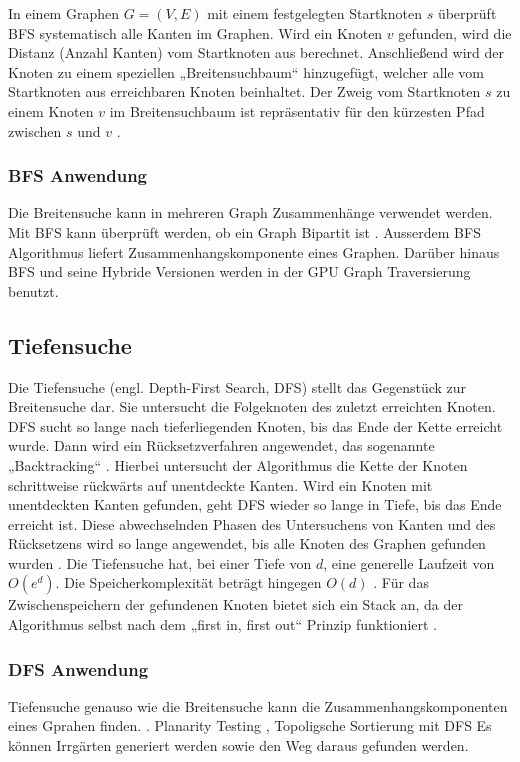 In einem Graphen $G = (V, E)$ mit einem festgelegten Startknoten $s$ überprüft BFS systematisch alle Kanten im Graphen. Wird ein Knoten $v$ gefunden, wird die Distanz (Anzahl Kanten) vom Startknoten aus berechnet. Anschließend wird der Knoten zu einem speziellen „Breitensuchbaum“ hinzugefügt, welcher alle vom Startknoten aus erreichbaren Knoten beinhaltet. Der Zweig vom Startknoten $s$ zu einem Knoten $v$ im Breitensuchbaum ist repräsentativ für den kürzesten Pfad zwischen $s$ und $v$ \cite{Cormen.2009}.

\subsubsection{BFS Anwendung}
Die Breitensuche kann in mehreren Graph Zusammenhänge verwendet werden.  Mit BFS kann überprüft werden, ob ein Graph Bipartit ist \cite{propTest}. Ausserdem BFS Algorithmus liefert Zusammenhangskomponente eines Graphen\cite{schmitz}. Darüber hinaus BFS und seine Hybride Versionen\cite{effHyb} werden in der GPU Graph Traversierung benutzt\cite{scaleGPU}. 

\subsection{Tiefensuche}

Die Tiefensuche (engl. Depth-First Search, DFS) stellt das Gegenstück zur Breitensuche dar. Sie untersucht die Folgeknoten des zuletzt erreichten Knoten. DFS sucht so lange nach tieferliegenden Knoten, bis das Ende der Kette erreicht wurde. Dann wird ein Rücksetzverfahren angewendet, das sogenannte „Backtracking“ \cite{Tarjan.1972}. Hierbei untersucht der Algorithmus die Kette der Knoten schrittweise rückwärts auf unentdeckte Kanten. Wird ein Knoten mit unentdeckten Kanten gefunden, geht DFS wieder so lange in Tiefe, bis das Ende erreicht ist. Diese abwechselnden Phasen des Untersuchens von Kanten und des Rücksetzens wird so lange angewendet, bis alle Knoten des Graphen gefunden wurden \cite{Korf.1985} \cite{Cormen.2009}. Die Tiefensuche hat, bei einer Tiefe von $d$, eine generelle Laufzeit von $O(e^d)$. Die Speicherkomplexität beträgt hingegen $O(d)$ \cite{Korf.1985}. Für das Zwischenspeichern der gefundenen Knoten bietet sich ein Stack an, da der Algorithmus selbst nach dem „first in, first out“ Prinzip funktioniert \cite{Tarjan.1972}.  


\subsubsection{DFS Anwendung}
Tiefensuche genauso wie die Breitensuche kann die Zusammenhangskomponenten eines Gprahen finden. \cite{schmitz} \cite{dfs}.  Planarity Testing \cite{dfsPlanar}, Topoligsche Sortierung mit DFS
Es können Irrgärten generiert werden sowie den Weg daraus gefunden werden\cite{examMaze}.


